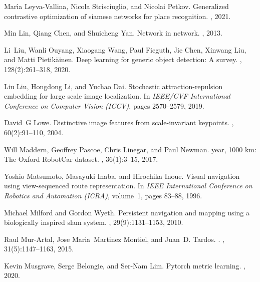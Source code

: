 \documentclass{article}
\begin{document}
\begin{thebibliography}{99}
Mar{\'\i}a Leyva-Vallina, Nicola Strisciuglio, and Nicolai Petkov.
\newblock Generalized contrastive optimization of siamese networks for place
  recognition.
, 2021.

Min Lin, Qiang Chen, and Shuicheng Yan.
\newblock Network in network.
, 2013.

Li~Liu, Wanli Ouyang, Xiaogang Wang, Paul Fieguth, Jie Chen, Xinwang Liu, and
  Matti Pietik{\"a}inen.
\newblock Deep learning for generic object detection: A survey.
, 128(2):261--318,
  2020.

Liu Liu, Hongdong Li, and Yuchao Dai.
\newblock Stochastic attraction-repulsion embedding for large scale image
  localization.
\newblock In {\em IEEE/CVF International Conference on Computer Vision (ICCV)},
  pages 2570--2579, 2019.

David~G Lowe.
\newblock Distinctive image features from scale-invariant keypoints.
, 60(2):91--110, 2004.

Will Maddern, Geoffrey Pascoe, Chris Linegar, and Paul Newman.
 year, 1000 km: The {Oxford RobotCar} dataset.
,
  36(1):3--15, 2017.

Yoshio Matsumoto, Masayuki Inaba, and Hirochika Inoue.
\newblock Visual navigation using view-sequenced route representation.
\newblock In {\em IEEE International Conference on Robotics and Automation
  (ICRA)}, volume~1, pages 83--88, 1996.

Michael Milford and Gordon Wyeth.
\newblock Persistent navigation and mapping using a biologically inspired slam
  system.
,
  29(9):1131--1153, 2010.

Raul Mur-Artal, Jose Maria~Martinez Montiel, and Juan~D. Tardos.
.
, 31(5):1147--1163, 2015.

Kevin Musgrave, Serge Belongie, and Ser-Nam Lim.
\newblock Pytorch metric learning.
, 2020.


\end{thebibliography}
\end{document}
